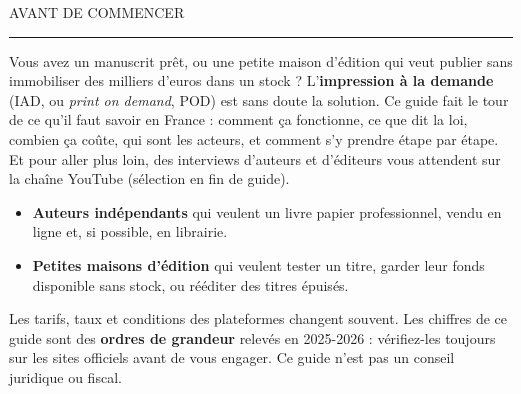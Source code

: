 {\pltitre\fontsize{22}{26}\selectfont AVANT DE COMMENCER}\par
{\color{plOrange}\rule{\linewidth}{3pt}}\par

Vous avez un manuscrit prêt, ou une petite maison d’édition qui veut
publier sans immobiliser des milliers d’euros dans un stock ?
L’\textbf{impression à la demande} (IAD, ou \emph{print on demand}, POD)
est sans doute la solution. Ce guide fait le tour de ce qu’il faut savoir
en France : comment ça fonctionne, ce que dit la loi, combien ça coûte,
qui sont les acteurs, et comment s’y prendre étape par étape.
Et pour aller plus loin, des interviews d’auteurs et d’éditeurs vous
attendent sur la chaîne YouTube
\href{\plYoutubeURL}{\plYoutubeAffichage} (sélection en fin de guide).

\begin{astuce}
\begin{itemize}
  \item \textbf{Auteurs indépendants} qui veulent un livre papier
        professionnel, vendu en ligne et, si possible, en librairie.
  \item \textbf{Petites maisons d’édition} qui veulent tester un titre,
        garder leur fonds disponible sans stock, ou rééditer des titres
        épuisés.
\end{itemize}
\end{astuce}

\begin{attention}[À lire]
Les tarifs, taux et conditions des plateformes changent souvent. Les
chiffres de ce guide sont des \textbf{ordres de grandeur} relevés en
2025-2026 : vérifiez-les toujours sur les sites officiels avant de vous
engager. Ce guide n’est pas un conseil juridique ou fiscal.
\end{attention}

\clearpage
\renewcommand{\contentsname}{Sommaire}
\setcounter{tocdepth}{2}
{\small\linespread{1}\selectfont\setlength{\parskip}{0pt}\tableofcontents}
